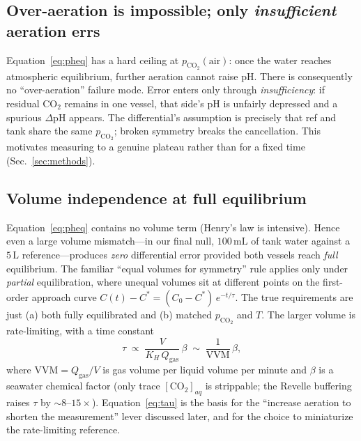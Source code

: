 \documentclass[11pt]{article}
\newcommand{\dpH}{\ensuremath{\Delta\mathrm{pH}}}
\newcommand{\co}{\ensuremath{\mathrm{CO_2}}}
\newcommand{\pco}{\ensuremath{p_{\mathrm{CO_2}}}}
\begin{document}
\subsection{Over-aeration is impossible; only \emph{insufficient} aeration errs}
Equation~\eqref{eq:pheq} has a hard ceiling at $\pco{}(\mathrm{air})$: once the
water reaches atmospheric equilibrium, further aeration cannot raise pH. There
is consequently no ``over-aeration'' failure mode. Error enters only through
\emph{insufficiency}: if residual \co{} remains in one vessel, that side's pH is
unfairly depressed and a spurious \dpH{} appears. The differential's assumption
is precisely that ref and tank share the same \pco{}; broken symmetry breaks
the cancellation. This motivates measuring to a genuine plateau rather than for
a fixed time (Sec.~\ref{sec:methods}).

\subsection{Volume independence at full equilibrium}
Equation~\eqref{eq:pheq} contains no volume term (Henry's law is
intensive). Hence even a large volume mismatch---in our final null,
$100\,\mathrm{mL}$ of tank water against a $5\,\mathrm{L}$ reference---produces
\emph{zero} differential error provided both vessels reach \emph{full}
equilibrium. The familiar ``equal volumes for symmetry'' rule applies only
under \emph{partial} equilibration, where unequal volumes sit at different
points on the first-order approach curve
$C(t)-C^\ast = (C_0-C^\ast)\,e^{-t/\tau}$. The true requirements are just
(a) both fully equilibrated and (b) matched \pco{} and $T$. The larger volume
is rate-limiting, with a time constant
\begin{equation}
\tau \;\propto\; \frac{V}{K_H\,Q_\mathrm{gas}}\,\beta
\;\sim\; \frac{1}{\mathrm{VVM}}\,\beta,
\label{eq:tau}
\end{equation}
where $\mathrm{VVM}=Q_\mathrm{gas}/V$ is gas volume per liquid volume per
minute and $\beta$ is a seawater chemical factor (only trace
$[\co{}]_{aq}$ is strippable; the Revelle buffering raises $\tau$ by
$\sim8$--$15\times$). Equation~\eqref{eq:tau} is the basis for the
``increase aeration to shorten the measurement'' lever discussed later, and for
the choice to miniaturize the rate-limiting reference.
\end{document}
